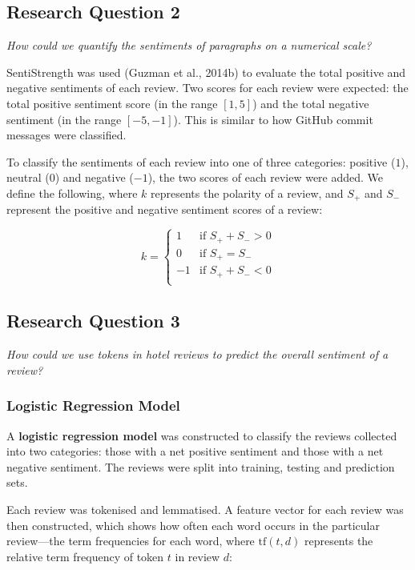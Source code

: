 \documentclass[12pt, bibliography=totocnumbered, paper=a4]{scrartcl}
\def\bf#1{\textbf{#1}}
\def\it#1{\textit{#1}}
\begin{document}
\subsection{Research Question 2}
\it{How could we quantify the sentiments of paragraphs on a numerical scale?}

SentiStrength was used (Guzman et al., 2014b) to evaluate the total positive %
and negative sentiments of each review. Two scores for each review were expected:
the total positive sentiment score (in the range $[1, 5]$) and the total negative
sentiment (in the range $[-5, -1]$). This is similar to how GitHub commit
messages were classified.

To classify the sentiments of each review into one of three categories:
positive ($1$), neutral ($0$) and negative ($-1$), the two scores of each review
were added. We define the following, where $k$ represents the polarity of a review,
and $S_+$ and $S_-$ represent the positive and negative sentiment scores of a review:

\begin{equation}
	k = \begin{cases}
		1  & \text{if } S_+ + S_- > 0 \\
		0  & \text{if } S_+ = S_-     \\
		-1 & \text{if } S_+ + S_- < 0 \\
	\end{cases}
	\label{eq:polarity}
\end{equation}

\subsection{Research Question 3}
\it{How could we use tokens in hotel reviews to predict the overall sentiment of a review?}

\subsubsection{Logistic Regression Model}
A \bf{logistic regression model} was constructed to classify the reviews collected into
two categories: those with a net positive sentiment and those with a net negative sentiment.
The reviews were split into training, testing and prediction sets.

Each review was tokenised and lemmatised. A feature vector for each review was
then constructed, which shows how often each word occurs in the particular review---the
term frequencies for each word, where $\text{tf}(t,d)$ represents the relative term frequency of
token $t$ in review $d$:
\end{document}
